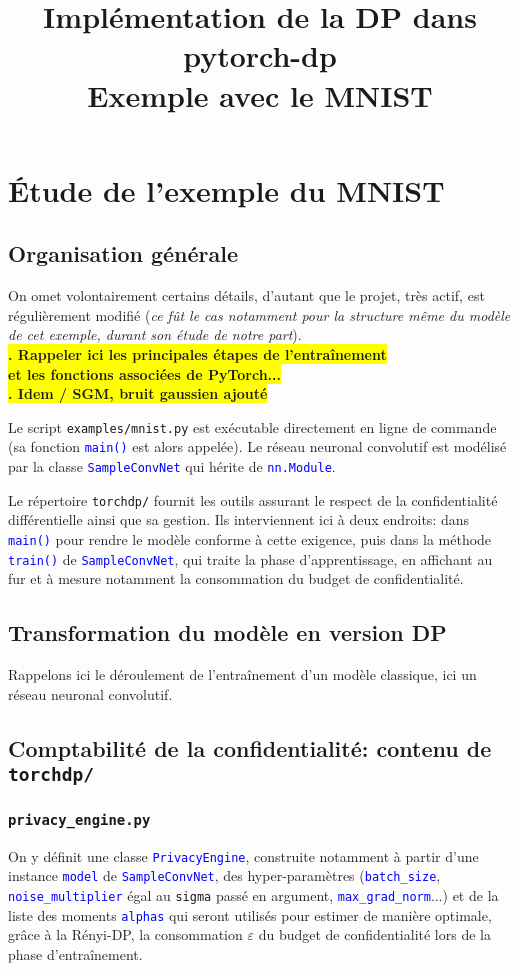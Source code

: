 \documentclass[a4paper,11pt]{article} %
\title{\textbf{Implémentation de la DP dans pytorch-dp\\{\small Exemple avec le MNIST}}}
\author{}
\date{}
\newcommand{\ttt}[1]{\texttt{#1}}
\newcommand{\file}[1]{\colorbox{blue!10}{\texttt{#1}}}
\newcommand{\code}[1]{\textcolor{blue}{\texttt{#1}}}
\newcommand{\rem}[1]{\colorbox{yellow}{\textbf{#1}}}
\begin{document}
\maketitle
\tableofcontents
\section{Étude de l'exemple du MNIST}

%
\subsection{Organisation générale}
%
On omet volontairement certains détails, d'autant que le projet, très actif, est régulièrement modifié (\emph{ce fût le cas notamment pour la structure même du modèle de cet exemple, durant son étude de notre part}).
\\\rem{. Rappeler ici les principales étapes de l'entraînement}
\\\rem{et les fonctions associées de PyTorch...}
\\\rem{. Idem / SGM, bruit gaussien ajouté}

Le script \file{examples/mnist.py} est exécutable directement en ligne de commande (sa fonction \code{main()} est alors appelée). Le réseau neuronal convolutif est modélisé par la classe \code{SampleConvNet} qui hérite de \code{nn.Module}.

Le répertoire \file{torchdp/} fournit les outils assurant le respect de la confidentialité différentielle ainsi que sa gestion. Ils interviennent ici à deux endroits: dans \code{main()} pour rendre le modèle conforme à cette exigence, puis dans la méthode \code{train()} de \code{SampleConvNet}, qui traite la phase d'apprentissage, en affichant au fur et à mesure notamment la consommation du \og budget de confidentialité\fg{}.
%
\subsection{Transformation du modèle en version DP}
%
Rappelons ici le déroulement de l'entraînement d'un modèle classique, ici un réseau neuronal convolutif.


%
\subsection{Comptabilité de la confidentialité: contenu de \file{torchdp/}}
%
\subsubsection{\file{privacy\_engine.py}}
%
On y définit une classe \code{PrivacyEngine}, construite notamment à partir d'une instance \code{model} de \code{SampleConvNet}, des hyper-paramètres (\code{batch\_size}, \code{noise\_multiplier} égal au \ttt{sigma} passé en argument, \code{max\_grad\_norm}...) et de la liste des moments \code{alphas} qui seront utilisés pour estimer de manière optimale, grâce à la Rényi-DP, la consommation $\varepsilon$ du budget de confidentialité lors de la phase d'entraînement.
\end{document}
